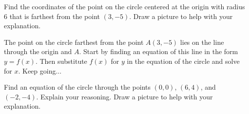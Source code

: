 \documentclass{ximera}
\begin{document}
\begin{question}  \label{Q:df454tt4443}
Find the coordinates of the point on the circle centered at the origin with radius $6$ that is farthest from the point $(3,-5)$. Draw a picture to help with your explanation.

\begin{hint}
The point on the circle farthest from the point $A(3,-5)$ lies on the line through the origin and $A$. Start by finding an equation of this line in the form $y=f(x)$. Then substitute $f(x)$ for $y$ in the equation of the circle and solve for $x$. Keep going...
\end{hint}

\end{question}

\begin{question} \label{Qsdfl4345r3}
Find an equation of the circle through the points $(0,0)$, $(6,4)$, and $(-2,-4)$. Explain your reasoning. Draw a picture to help with your explanation.

\end{question}

\fi
\end{document}
